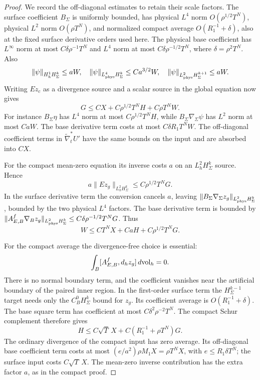 \documentclass[11pt]{amsart}
\theoremstyle{definition}
\theoremstyle{remark}
\theoremstyle{plain}
\begin{document}
\begin{proof}
We record the off-diagonal estimates to retain their
scale factors. The surface coefficient $B_\Sigma$ is
uniformly bounded, has physical $L^4$ norm
$O(\rho^{1/2}T^N)$, physical $L^2$ norm $O(\rho T^N)$,
and normalized compact average $O(R_1^{-1}+\delta)$,
also at the fixed surface derivative orders used here.
The physical base coefficient has $L^\infty$ norm at
most $C\delta\rho^{-1}T^N$ and $L^4$ norm at most
$C\delta\rho^{-1/2}T^N$, where $\delta=\rho^2T^N$.
Also
\[
 \|\psi\|_{H^1_hH^k_\Sigma}\leq aW,\quad
 \|\psi\|_{L^4_{\rm phys}H^k_\Sigma}\leq Ca^{3/2}W,\quad
 \|\psi\|_{L^2_{\rm phys}H^{k+1}_\Sigma}\leq aW .
\]
Writing $Ez_c$ as a divergence source and a scalar
source in the global equation now gives
\begin{equation}\label{eq:excision-rotation-global-inequality}
                G\leq CX+C\rho^{1/2}T^NH+C\rho T^NW .
\end{equation}
For instance $B_\Sigma\eta$ has $L^4$ norm at most
$C\rho^{1/2}T^NH$, while
$B_\Sigma\nabla_\Sigma\psi$ has $L^2$ norm at most
$CaW$. The base derivative term costs at most
$C\delta R_1T^NW$. The off-diagonal coefficient
terms in $\widetilde\nabla_t^*U'$ have the same bounds
on the input and are absorbed into $CX$.

For the compact mean-zero equation its inverse costs
$a$ on an $L^2_hH^k_\Sigma$ source. Hence
\[
 a\|Ez_g\|_{L^2_hH^k_\Sigma}\leq C\rho^{1/2}T^NG.
\]
In the surface derivative term the conversion cancels
$a$, leaving
$\|B_\Sigma\nabla_\Sigma z_g\|_{L^2_{\rm phys}H^k_\Sigma}$,
bounded by the two physical $L^4$ factors.
The base derivative term is bounded by
$\|A_{E,B}^f\nabla_Bz_g\|_{L^2_{\rm phys}H^k_\Sigma}
 \leq C\delta\rho^{-1/2}T^NG$.
Thus
\begin{equation}\label{eq:excision-rotation-zero-mean-inequality}
                   W\leq CT^NX+CaH+C\rho^{1/2}T^NG .
\end{equation}

For the compact average the divergence-free choice
is essential:
\[
                 \int_B[A_{E,B}^f,d_hz_g]\,d{\rm vol}_h=0.
\]
There is no normal boundary term, and the coefficient
vanishes near the artificial boundary of the paired
inner region. In the first-order surface term the
$H^{k-1}_\Sigma$ target needs only the
$C^0_BH^k_\Sigma$ bound for $z_g$.
Its coefficient average is $O(R_1^{-1}+\delta)$.
The base square term has coefficient at most
$C\delta^2\rho^{-2}T^N$.
The compact Schur complement therefore gives
\begin{equation}\label{eq:excision-rotation-mean-inequality}
                   H\leq C\sqrt T\,X
                              +C(R_1^{-1}+\rho T^N)G .
\end{equation}
The ordinary divergence of the compact input has zero
average. Its off-diagonal base coefficient term costs
at most $(e/a^2)\rho M_1X=\rho T^NX$, with
$e\leq R_1\delta T^N$; the surface input costs
$C\sqrt T\,X$. The mean-zero inverse contribution
has the extra factor $a$, as in the compact proof.


\end{proof}
\end{document}
